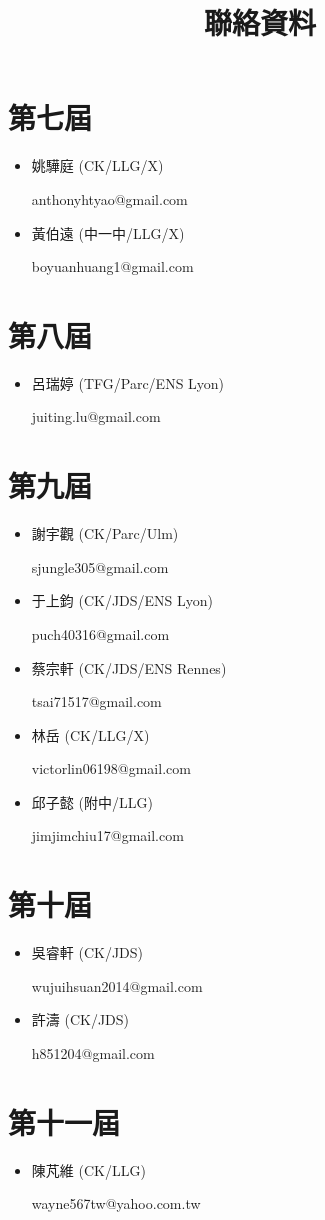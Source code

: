 \documentclass[a4paper]{article}
\title{聯絡資料}
\author{}
\date{}
\begin{document}
\maketitle

\section*{第七屆}
\begin{itemize}
\item
姚驊庭 (CK/LLG/X)

anthonyhtyao@gmail.com
\item
黃伯遠 (中一中/LLG/X)

boyuanhuang1@gmail.com
\end{itemize}
\section*{第八屆}
\begin{itemize}
\item
呂瑞婷 (TFG/Parc/ENS Lyon)

juiting.lu@gmail.com
\end{itemize}
\section*{第九屆}
\begin{itemize}
\item
謝宇觀 (CK/Parc/Ulm)

sjungle305@gmail.com
\item
于上鈞 (CK/JDS/ENS Lyon)

puch40316@gmail.com
\item
蔡宗軒 (CK/JDS/ENS Rennes)

tsai71517@gmail.com
\item
林岳 (CK/LLG/X)

victorlin06198@gmail.com
\item
邱子懿 (附中/LLG)

jimjimchiu17@gmail.com
\end{itemize}
\section*{第十屆}
\begin{itemize}
\item
吳睿軒 (CK/JDS)

wujuihsuan2014@gmail.com
\item
許濤 (CK/JDS)

h851204@gmail.com
\end{itemize}
\section*{第十一屆}
\begin{itemize}
\item
陳芃維 (CK/LLG)

wayne567tw@yahoo.com.tw
\end{itemize}
\end{document}
